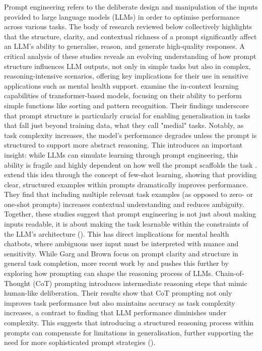 Prompt engineering refers to the deliberate design and manipulation of the inputs provided to large language models (LLMs) in order to optimise performance across various tasks. The body of research reviewed below collectively highlights that the structure, clarity, and contextual richness of a prompt significantly affect an LLM’s ability to generalise, reason, and generate high-quality responses. A critical analysis of these studies reveals an evolving understanding of how prompt structure influences LLM outputs, not only in simple tasks but also in complex, reasoning-intensive scenarios, offering key implications for their use in sensitive applications such as mental health support.
\cite{garg2021transformers} examine the in-context learning capabilities of transformer-based models, focusing on their ability to perform simple functions like sorting and pattern recognition. Their findings underscore that prompt structure is particularly crucial for enabling generalisation in tasks that fall just beyond training data, what they call "medial" tasks. Notably, as task complexity increases, the model's performance degrades unless the prompt is structured to support more abstract reasoning. This introduces an important insight: while LLMs can simulate learning through prompt engineering, this ability is fragile and highly dependent on how well the prompt scaffolds the task \cite{garg2021transformers}.
\cite{brown2020language} extend this idea through the concept of few-shot learning, showing that providing clear, structured examples within prompts dramatically improves performance. They find that including multiple relevant task examples (as opposed to zero- or one-shot prompts) increases contextual understanding and reduces ambiguity. Together, these studies suggest that prompt engineering is not just about making inputs readable, it is about making the task learnable within the constraints of the LLM’s architecture (\cite{brown2020language}). This has direct implications for mental health chatbots, where ambiguous user input must be interpreted with nuance and sensitivity.
While Garg and Brown focus on prompt clarity and structure in general task completion, more recent work by \cite{wang2022self} and \cite{yao2023tree} pushes this further by exploring how prompting can shape the reasoning process of LLMs. \cite{wang2022self} Chain-of-Thought (CoT) prompting introduces intermediate reasoning steps that mimic human-like deliberation. Their results show that CoT prompting not only improves task performance but also maintains accuracy as task complexity increases, a contrast to \cite{garg2021transformers} finding that LLM performance diminishes under complexity. This suggests that introducing a structured reasoning process within prompts can compensate for limitations in generalisation, further supporting the need for more sophisticated prompt strategies (\cite{wang2022self}).

